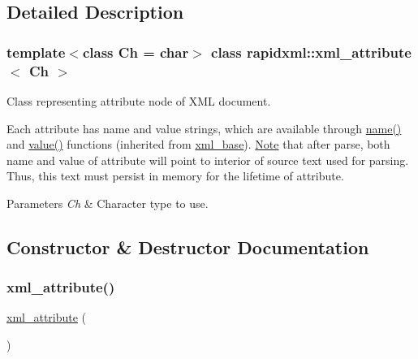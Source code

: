 \subsection{Detailed Description}
\subsubsection*{template$<$class Ch = char$>$\newline
class rapidxml\+::xml\+\_\+attribute$<$ Ch $>$}

Class representing attribute node of X\+ML document. 

Each attribute has name and value strings, which are available through \mbox{\hyperlink{classrapidxml_1_1xml__base_af8436e9ee14c127220113eaa956eafee}{name()}} and \mbox{\hyperlink{classrapidxml_1_1xml__base_a558b1045e6751e4024309d41bf35c542}{value()}} functions (inherited from \mbox{\hyperlink{classrapidxml_1_1xml__base}{xml\+\_\+base}}). \mbox{\hyperlink{classNote}{Note}} that after parse, both name and value of attribute will point to interior of source text used for parsing. Thus, this text must persist in memory for the lifetime of attribute. 
\begin{DoxyParams}{Parameters}
{\em Ch} & Character type to use. \\
\hline
\end{DoxyParams}


\subsection{Constructor \& Destructor Documentation}
\mbox{\label{classrapidxml_1_1xml__attribute_ad5464aadf08269a886b730993525db34}} 
\subsubsection{\texorpdfstring{xml\+\_\+attribute()}{xml\_attribute()}}
{\footnotesize\ttfamily \mbox{\hyperlink{classrapidxml_1_1xml__attribute}{xml\+\_\+attribute}} (\begin{DoxyParamCaption}{ }\end{DoxyParamCaption})\hspace{0.3cm}{\ttfamily [inline]}}



